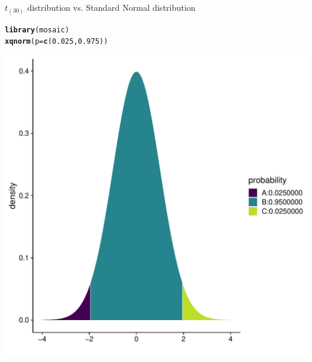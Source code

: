 \documentclass[10pt]{beamer}\usepackage[]{graphicx}\usepackage[]{color}
\makeatletter
\def\maxwidth{ %
  \ifdim\Gin@nat@width>\linewidth
    \linewidth
  \else
    \Gin@nat@width
  \fi
}
\newcommand{\hlnum}[1]{\textcolor[rgb]{0.686,0.059,0.569}{#1}}%
\newcommand{\hlstd}[1]{\textcolor[rgb]{0.345,0.345,0.345}{#1}}%
\newcommand{\hlkwc}[1]{\textcolor[rgb]{0.333,0.667,0.333}{#1}}%
\newcommand{\hlkwd}[1]{\textcolor[rgb]{0.737,0.353,0.396}{\textbf{#1}}}%
\newenvironment{kframe}{%
 \def\at@end@of@kframe{}%
 \ifinner\ifhmode%
  \def\at@end@of@kframe{\end{minipage}}%
  \begin{minipage}{\columnwidth}%
 \fi\fi%
 \def\FrameCommand##1{\hskip\@totalleftmargin \hskip-\fboxsep
 \colorbox{shadecolor}{##1}\hskip-\fboxsep
     \hskip-\linewidth \hskip-\@totalleftmargin \hskip\columnwidth}%
 \MakeFramed {\advance\hsize-\width
   \@totalleftmargin\z@ \linewidth\hsize
   \@setminipage}}%
 {\par\unskip\endMakeFramed%
 \at@end@of@kframe}
\newenvironment{knitrout}{}{} %
\makeatother
\begin{document}
\begin{frame}[fragile]{$t_{(30)}$ distribution vs. Standard Normal distribution}
	\begin{minipage}{0.47\textwidth}
\begin{knitrout}\tiny
{}\color{fgcolor}\begin{kframe}
\begin{alltt}
\hlkwd{library}\hlstd{(mosaic)}
\hlkwd{xqnorm}\hlstd{(}\hlkwc{p} \hlstd{=} \hlkwd{c}\hlstd{(}\hlnum{0.025}\hlstd{,} \hlnum{0.975}\hlstd{))}
\end{alltt}
\end{kframe}
\end{knitrout}
\begin{knitrout}\tiny
{}\color{fgcolor}

{\centering \includegraphics[width=\maxwidth]{figure/unnamed-chunk-6-1} 

}



\end{knitrout}
\end{minipage}
\end{frame}
\end{document}
